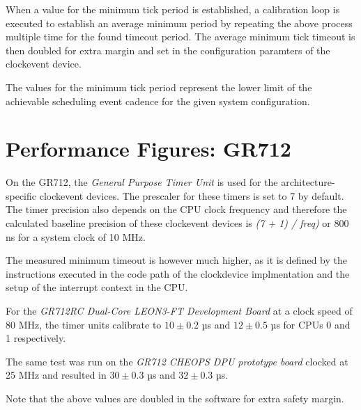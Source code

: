 When a value for the minimum tick period is established, a calibration loop
is executed to establish an average minimum period by repeating the
above process multiple time for the found timeout period. The average
minimum tick timeout is then doubled for extra margin and set in the
configuration paramters of the clockevent device.

The values for the minimum tick period represent the lower limit of the
achievable scheduling event cadence for the given system configuration.


\section{Performance Figures: GR712}

On the GR712, the \emph{General Purpose Timer Unit}\cite{GR712UM} is used for
the architecture-specific clockevent devices. The prescaler for these timers
is set to 7 by default. The timer precision also depends on the CPU clock
frequency and therefore the calculated baseline precision of these clockevent
devices is \emph{ (7 + 1) / freq)} or 800 ns for a system clock of 10 MHz.

The measured minimum timeout is however much higher, as it is defined by the
instructions executed in the code path of the clockdevice implmentation and the
setup of the interrupt context in the CPU.

For the \emph{GR712RC Dual-Core LEON3-FT Development Board} at a clock speed of
80 MHz, the timer units calibrate to $10 \pm 0.2$ µs and $12 \pm 0.5$ µs for
CPUs 0 and 1 respectively.

The same test was run on the \emph{GR712 CHEOPS DPU prototype board} clocked
at 25 MHz and resulted in $30\pm 0.3$ µs and $32 \pm 0.3$ µs.

Note that the above values are doubled in the software for extra safety margin.






